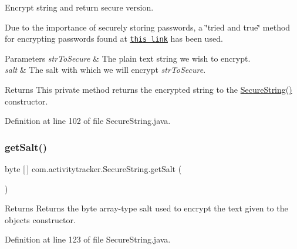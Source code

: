 Encrypt string and return secure version.

Due to the importance of securely storing passwords, a \char`\"{}tried and true\char`\"{} method for encrypting passwords found at \href{https://howtodoinjava.com/security/how-to-generate-secure-password-hash-md5-sha-pbkdf2-bcrypt-examples/}{\tt this link} has been used.


\begin{DoxyParams}{Parameters}
{\em str\+To\+Secure} & The plain text string we wish to encrypt. \\
\hline
{\em salt} & The salt with which we will encrypt {\itshape str\+To\+Secure}.\\
\hline
\end{DoxyParams}
\begin{DoxyReturn}{Returns}
This private method returns the encrypted string to the \mbox{\hyperlink{classcom_1_1activitytracker_1_1_secure_string_a889fcbf0c1f771962ac81886f49e389e}{Secure\+String()}} constructor. 
\end{DoxyReturn}


Definition at line 102 of file Secure\+String.\+java.

\mbox{\label{classcom_1_1activitytracker_1_1_secure_string_ab5369653852da122aba874f35cbda9a5}} 
\subsubsection{\texorpdfstring{get\+Salt()}{getSalt()}}
{\footnotesize\ttfamily byte \mbox{[}$\,$\mbox{]} com.\+activitytracker.\+Secure\+String.\+get\+Salt (\begin{DoxyParamCaption}{ }\end{DoxyParamCaption})}

\begin{DoxyReturn}{Returns}
Returns the byte array-\/type salt used to encrypt the text given to the object\textquotesingle{}s constructor. 
\end{DoxyReturn}


Definition at line 123 of file Secure\+String.\+java.

\mbox{\label{classcom_1_1activitytracker_1_1_secure_string_aef531e12618c5c147adc52fda0d4add8}} 
